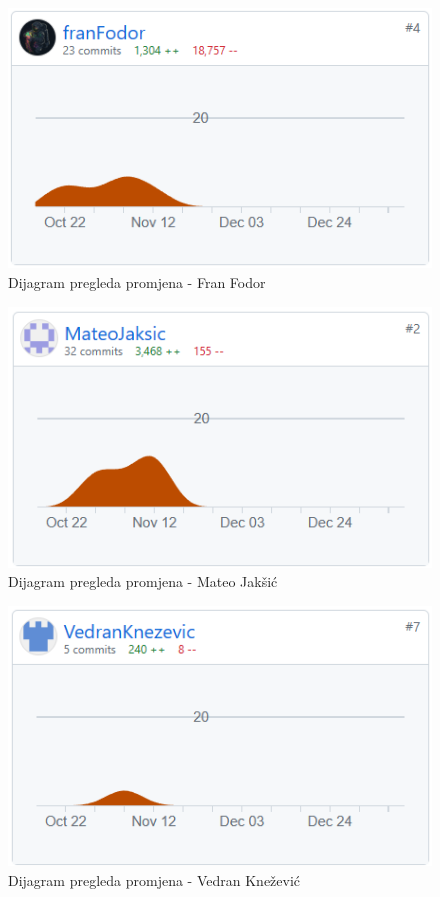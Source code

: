 		\begin{figure}[H]
			\includegraphics[scale=0.80]{slike/fran.png} %
			\centering
			\caption{Dijagram pregleda promjena - Fran Fodor}
			\label{fig:DijagramPregledaPromjena}
		\end{figure}

		\begin{figure}[H]
			\includegraphics[scale=0.80]{slike/mateo.png} %
			\centering
			\caption{Dijagram pregleda promjena - Mateo Jakšić}
			\label{fig:DijagramPregledaPromjena}
		\end{figure}

		\begin{figure}[H]
			\includegraphics[scale=0.80]{slike/vedran.png} %
			\centering
			\caption{Dijagram pregleda promjena - Vedran Knežević}
			\label{fig:DijagramPregledaPromjena}
		\end{figure}

